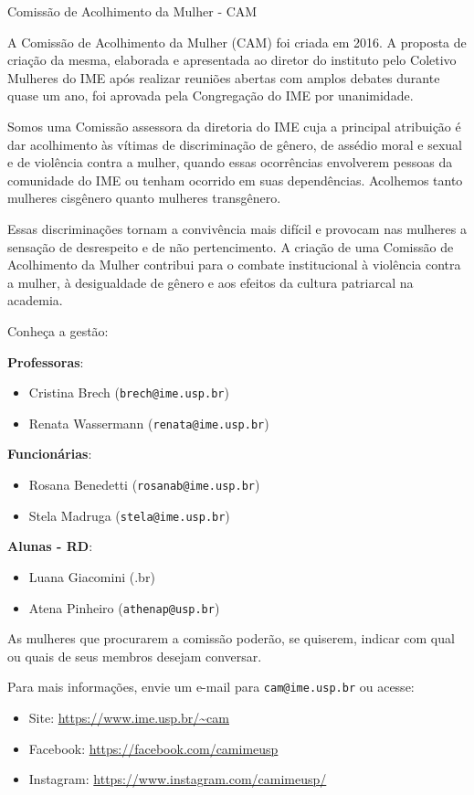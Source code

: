 \begin{subsecao}{Comissão de Acolhimento da Mulher - CAM}

A Comissão de Acolhimento da Mulher (CAM) foi criada em 2016. A proposta de 
criação da mesma, elaborada e apresentada ao diretor do instituto pelo 
Coletivo Mulheres do IME após realizar reuniões abertas com amplos debates 
durante quase um ano, foi aprovada pela Congregação do IME por unanimidade.

Somos uma Comissão assessora da diretoria do IME cuja a principal atribuição 
é dar acolhimento às vítimas de discriminação de gênero, de assédio moral e 
sexual e de violência contra a mulher, quando essas ocorrências envolverem 
pessoas da comunidade do IME ou tenham ocorrido em suas dependências. Acolhemos
tanto mulheres cisgênero quanto mulheres transgênero.

Essas discriminações tornam a convivência mais difícil e provocam nas mulheres
a sensação de desrespeito e de não pertencimento. A criação de uma Comissão de 
Acolhimento da Mulher contribui para o combate institucional à violência contra
a mulher, à desigualdade de gênero e aos efeitos da cultura patriarcal na academia.

Conheça a gestão: 

\textbf{Professoras}: 
\vspace{-15pt}
\begin{itemize}
  \item Cristina Brech ({\tt brech@ime.usp.br})
  \item Renata Wassermann ({\tt renata@ime.usp.br})
\end{itemize}

\textbf{Funcionárias}: 
\vspace{-15pt}
\begin{itemize}
  \item Rosana Benedetti ({\tt rosanab@ime.usp.br})
  \item Stela Madruga ({\tt stela@ime.usp.br})
\end{itemize}

\textbf{Alunas - RD}: 
\vspace{-15pt}
\begin{itemize}
  \item Luana Giacomini ({\luanagiacominib@usp.br})
  \item Atena Pinheiro ({\tt athenap@usp.br})
\end{itemize}

As mulheres que procurarem a comissão poderão, se quiserem, indicar com qual ou 
quais de seus membros desejam conversar.

Para mais informações, envie um e-mail para {\tt cam@ime.usp.br} ou acesse:
\begin{itemize}
  \item Site: \url{https://www.ime.usp.br/~cam}
  \item Facebook: \url{https://facebook.com/camimeusp}
  \item Instagram: \url{https://www.instagram.com/camimeusp/}
\end{itemize}


\end{subsecao}
